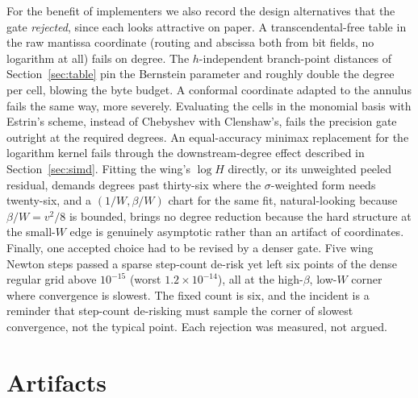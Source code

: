 \documentclass[11pt]{article}
\begin{document}
For the benefit of implementers we also record the design alternatives that the gate \emph{rejected}, since each looks attractive on paper. A transcendental-free table in the raw mantissa coordinate (routing and abscissa both from bit fields, no logarithm at all) fails on degree. The $h$-independent branch-point distances of Section~\ref{sec:table} pin the Bernstein parameter and roughly double the degree per cell, blowing the byte budget. A conformal coordinate adapted to the annulus fails the same way, more severely. Evaluating the cells in the monomial basis with Estrin's scheme, instead of Chebyshev with Clenshaw's, fails the precision gate outright at the required degrees. An equal-accuracy minimax replacement for the logarithm kernel fails through the downstream-degree effect described in Section~\ref{sec:simd}. Fitting the wing's $\log H$ directly, or its unweighted peeled residual, demands degrees past thirty-six where the $\sigma$-weighted form needs twenty-six, and a $(1/W,\beta/W)$ chart for the same fit, natural-looking because $\beta/W=v^2/8$ is bounded, brings no degree reduction because the hard structure at the small-$W$ edge is genuinely asymptotic rather than an artifact of coordinates. Finally, one accepted choice had to be revised by a denser gate. Five wing Newton steps passed a sparse step-count de-risk yet left six points of the dense regular grid above $10^{-15}$ (worst $1.2\times10^{-14}$), all at the high-$\beta$, low-$W$ corner where convergence is slowest. The fixed count is six, and the incident is a reminder that step-count de-risking must sample the corner of slowest convergence, not the typical point. Each rejection was measured, not argued.

\section{Artifacts}
\label{app:artifacts}
\end{document}
